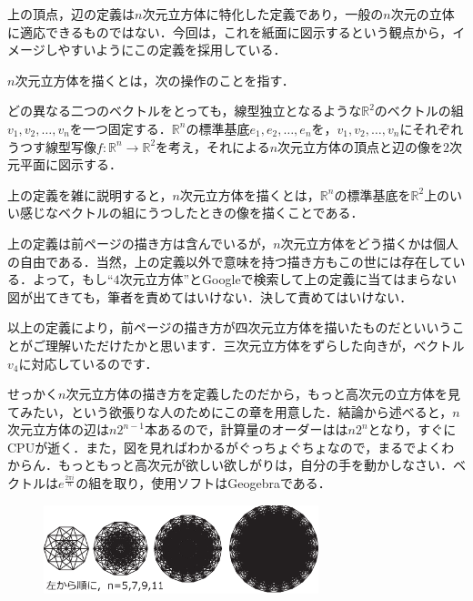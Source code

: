 \documentclass[./main]{subfiles} %
\begin{document}
\rem
上の頂点，辺の定義は$n$次元立方体に特化した定義であり，一般の$n$次元の立体に適応できるものではない．今回は，これを紙面に図示するという観点から，イメージしやすいようにこの定義を採用している．

\maskdefi [$n$次元立方体を描く]

$n$次元立方体を描くとは，次の操作のことを指す．

どの異なる二つのベクトルをとっても，線型独立となるような$\mathbb{R}^2$のベクトルの組$v_1, v_2 , \ldots , v_n$を一つ固定する．$\mathbb{R}^n$の標準基底$e_1 , e_2 , \ldots , e_n$を，$v_1,v_2, \ldots ,v_n$にそれぞれうつす線型写像$f \colon \mathbb{R}^n \rightarrow \mathbb{R}^2$を考え，それによる$n$次元立方体の頂点と辺の像を$2$次元平面に図示する．

\rem
上の定義を雑に説明すると，$n$次元立方体を描くとは，$\mathbb{R}^n$の標準基底を$\mathbb{R}^2$上のいい感じなベクトルの組にうつしたときの像を描くことである．

\rem

上の定義は前ページの描き方は含んでいるが，$n$次元立方体をどう描くかは個人の自由である．当然，上の定義以外で意味を持つ描き方もこの世には存在している．よって，もし``$4$次元立方体''とGoogleで検索して上の定義に当てはまらない図が出てきても，筆者を責めてはいけない．決して責めてはいけない．

以上の定義により，前ページの描き方が四次元立方体を描いたものだといいうことがご理解いただけたかと思います．三次元立方体をずらした向きが，ベクトル$v_4$に対応しているのです．

せっかく$n$次元立方体の描き方を定義したのだから，もっと高次元の立方体を見てみたい，という欲張りな人のためにこの章を用意した．結論から述べると，$n$次元立方体の辺は$n2^{n-1}$本あるので，計算量のオーダーはは$n2^n$となり，すぐに{\rm CPU}が逝く．また，図を見ればわかるがぐっちょぐちょなので，まるでよくわからん．もっともっと高次元が欲しい欲しがりは，自分の手を動かしなさい．ベクトルは$e^{\frac{2\pi i}{n}}$の組を取り，使用ソフトは{\rm Geogebra}である．

\begin{figure}[h]
\begin{center}
\includegraphics[width=80mm]{mask_rittai4.eps}
\end{center}
\end{figure}
\end{document}
